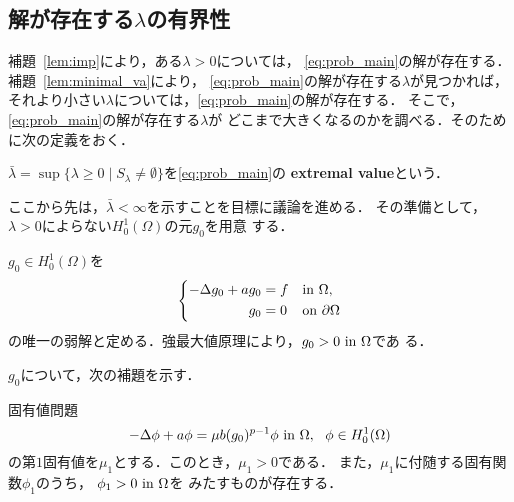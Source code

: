\subsection{解が存在する$\lambda$の有界性}

補題~\ref{lem:imp}により，ある$\lambda > 0$については，
\ref{eq:prob_main}の解が存在する．
補題~\ref{lem:minimal_va}により，
\ref{eq:prob_main}の解が存在する$\lambda$が見つかれば，
それより小さい$\lambda$については，\ref{eq:prob_main}の解が存在する．
そこで，\ref{eq:prob_main}の解が存在する$\lambda$が
どこまで大きくなるのかを調べる．そのために次の定義をおく．

\begin{defn} \label{defn:ext}
 $\bar{\lambda} = \sup \{ \lambda \geq 0 \mid S_\lambda \neq \emptyset
 \}$を\ref{eq:prob_main}の {\bf extremal value}という．
\end{defn}

ここから先は，$\bar{\lambda} < \infty$を示すことを目標に議論を進める．
その準備として，$\lambda > 0$によらない$H_0^1(\Omega)$の元$g_0$を用意
する．

\begin{nota} \label{nota:g_0}
 $g_0 \in H_0^1(\Omega)$を
 \begin{align}
  \left\{
  \begin{aligned}
   -\Delta g_0 + a g_0 
    &= f  & &\text{in}~ \Omega,  \\
   g_0 &= 0 & &\text{on}~ \partial\Omega
  \end{aligned}
  \right. \label{eq:g_0}
 \end{align}
 の唯一の弱解と定める．強最大値原理により，$g_0 > 0 ~\text{in}~ \Omega$であ
 る．
\end{nota}
 
$g_0$について，次の補題を示す．

\begin{lem} \label{lem:g_0}
 固有値問題
 \[
  -\Delta \phi + a \phi = \mu b (g_0)^{p-1}\phi ~\text{in}~ \Omega, \ \
 \phi \in H_0^1(\Omega)
 \]
 の第$1$固有値を$\mu_1$とする．このとき，$\mu_1 > 0$である．
 また，$\mu_1$に付随する固有関数$\phi_1$のうち，
 $\phi_1 > 0 ~\text{in}~ \Omega$を
 みたすものが存在する．
\end{lem}

